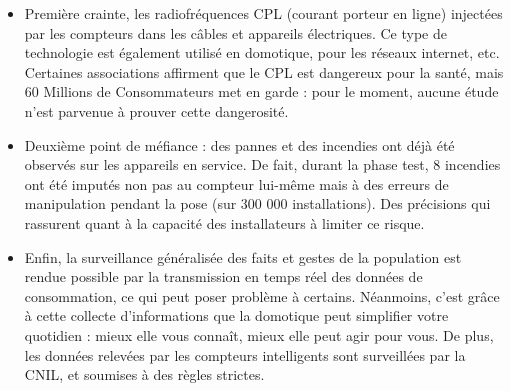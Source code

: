 \begin{itemize}[label=\textbullet]
\item Première crainte, les radiofréquences CPL (courant porteur en ligne) injectées par les compteurs dans les câbles et appareils électriques. Ce type de technologie est également utilisé en domotique, pour les réseaux internet, etc. Certaines associations affirment que le CPL est dangereux pour la santé, mais 60 Millions de Consommateurs met en garde : pour le moment, aucune étude n'est parvenue à prouver cette dangerosité.
\item Deuxième point de méfiance : des pannes et des incendies ont déjà été observés sur les appareils en service. De fait, durant la phase test, 8 incendies ont été imputés non pas au compteur lui-même mais à des erreurs de manipulation pendant la pose (sur 300 000 installations). Des précisions qui rassurent quant à la capacité des installateurs à limiter ce risque.
\item Enfin, la surveillance généralisée des faits et gestes de la population est rendue possible par la transmission en temps réel des données de consommation, ce qui peut poser problème à certains. Néanmoins, c'est grâce à cette collecte d'informations que la domotique peut simplifier votre quotidien : mieux elle vous connaît, mieux elle peut agir pour vous. De plus, les données relevées par les compteurs intelligents sont surveillées par la CNIL, et soumises à des règles strictes.
\end{itemize}